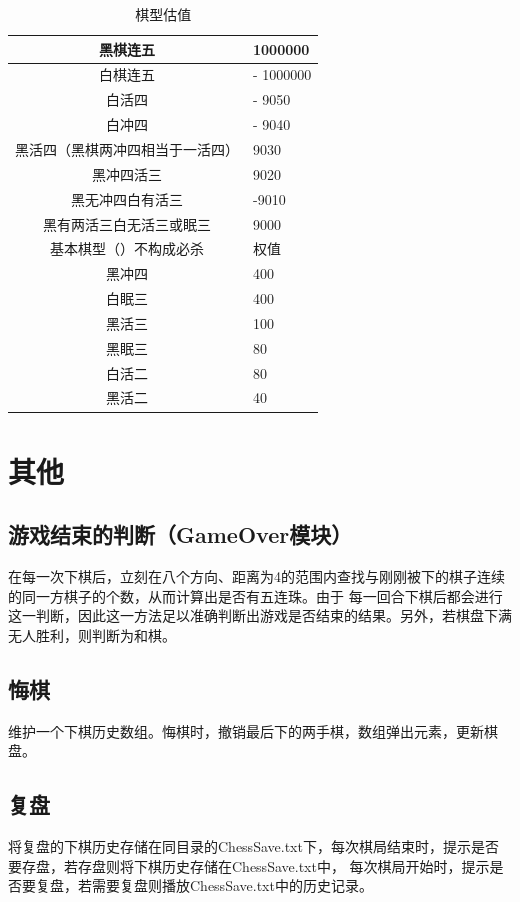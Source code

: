 \documentclass{acm_proc_article-sp}
\begin{document}
\begin{table}
	\centering
	\caption{棋型估值}
	\begin{tabular}{|c|l|} \hline
	黑棋连五 & 1000000 \\ \hline
	 白棋连五 &- 1000000 \\ \hline
	 白活四 &- 9050 \\ \hline
	 白冲四 &- 9040 \\ \hline
	 黑活四（黑棋两冲四相当于一活四） &9030 \\ \hline
	 黑冲四活三& 9020 \\ \hline
	 黑无冲四白有活三 &-9010\\ \hline
	 
	 黑有两活三白无活三或眠三& 9000 \\ \hline
	基本棋型（）不构成必杀 &  权值\\ \hline
	 黑冲四 &  400\\ \hline
	 白眠三 &  400\\ \hline
	 黑活三 &  100\\ \hline
     黑眠三 &  80\\ \hline
     白活二    &  80\\ \hline
     黑活二     &  40\\ \hline
	\end{tabular}
\end{table}

\section{\textbf{其他}}
\subsection{\textbf{游戏结束的判断（GameOver模块）}}
在每一次下棋后，立刻在八个方向、距离为4的范围内查找与刚刚被下的棋子连续的同一方棋子的个数，从而计算出是否有五连珠。由于
每一回合下棋后都会进行这一判断，因此这一方法足以准确判断出游戏是否结束的结果。另外，若棋盘下满无人胜利，则判断为和棋。
\subsection{\textbf{悔棋}}
维护一个下棋历史数组。悔棋时，撤销最后下的两手棋，数组弹出元素，更新棋盘。\\
\subsection{\textbf{复盘}}
将复盘的下棋历史存储在同目录的ChessSave.txt下，每次棋局结束时，提示是否要存盘，若存盘则将下棋历史存储在ChessSave.txt中，
每次棋局开始时，提示是否要复盘，若需要复盘则播放ChessSave.txt中的历史记录。\\
\end{document}

